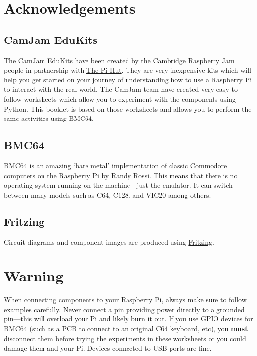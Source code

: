 \begin{titlepage}
\section*{Acknowledgements}

\subsection*{CamJam EduKits}


The CamJam EduKits have been created by the \href{https://camjam.me/}{Cambridge Raspberry Jam} people in partnership with \href{https://thepihut.com/collections/camjam-edukit}{The Pi Hut}.  They are very inexpensive kits which will help you get started on your journey of understanding how to use a Raspberry Pi to interact with the real world.  The CamJam team have created very easy to follow worksheets which allow you to experiment with the components using Python.  This booklet is based on those worksheets and allows you to perform the same activities using BMC64.

\subsection*{BMC64}

\href{https://github.com/randyrossi/bmc64}{BMC64} is an amazing `bare metal' implementation of classic Commodore computers on the Raspberry Pi by Randy Rossi.  This means that there is no operating system running on the machine---just the emulator.  It can switch between many models such as C64, C128, and VIC20 among others.

\subsection*{Fritzing}

Circuit diagrams and component images are produced using \href{https://fritzing.org/}{Fritzing}.
\vfill
\section*{\color{red}Warning}

When connecting components to your Raspberry Pi, always make sure to follow examples carefully.  Never connect a pin providing power directly to a grounded pin---this will overload your Pi and likely burn it out.  If you use GPIO devices for BMC64 (such as a PCB to connect to an original C64 keyboard, etc), you \textbf{must} disconnect them before trying the experiments in these worksheets or you could damage them and your Pi.  Devices connected to USB ports are fine.

\end{titlepage}

